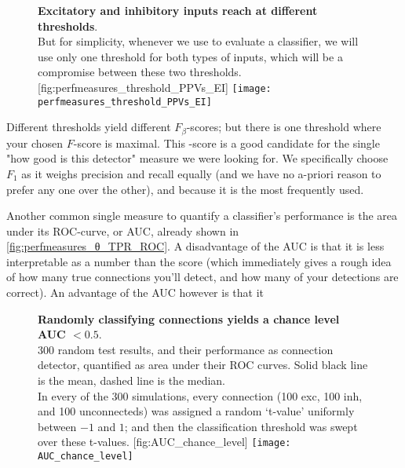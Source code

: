 \begin{figure}
    \begin{sidecaption}
        {\textbf{Excitatory and inhibitory inputs reach \maxF at different thresholds}.\\
        But for simplicity, whenever we use \maxF to evaluate a classifier, we will use only one threshold for both types of inputs, which will be a compromise between these two thresholds.}
        [fig:perfmeasures_threshold_PPVs_EI]
        \texttt{[image: perfmeasures\_threshold\_PPVs\_EI]}
    \end{sidecaption}
\end{figure}

Different thresholds yield different $F_β$-scores; but there is one threshold where your chosen $F$-score is maximal. This \maxF-score is a good candidate for the single "how good is this detector" measure we were looking for. We specifically choose $F_1$ as it weighs precision and recall equally (and we have no a-priori reason to prefer any one over the other), and because it is the most frequently used.

Another common single measure to quantify a classifier's performance is the area under its ROC-curve, or AUC, already shown in \cref{fig:perfmeasures_θ_TPR_ROC}. A disadvantage of the AUC is that it is less interpretable as a number than the \maxF score (which immediately gives a rough idea of how many true connections you'll detect, and how many of your detections are correct).
An advantage of the AUC however is that it

\begin{figure}
    \begin{sidecaption}
        {\textbf{Randomly classifying connections yields a chance level AUC $< 0.5$}.\\
        300 random test results, and their performance as connection detector, quantified as area under their ROC curves. Solid black line is the mean, dashed line is the median.\\
        In every of the 300 simulations, every connection (100 exc, 100 inh, and 100 unconnecteds) was assigned a random `t-value' uniformly between $-1$ and $1$; and then the classification threshold was swept over these t-values.}
        [fig:AUC_chance_level]
        \texttt{[image: AUC\_chance\_level]}
    \end{sidecaption}
\end{figure}



\FloatBarrier
